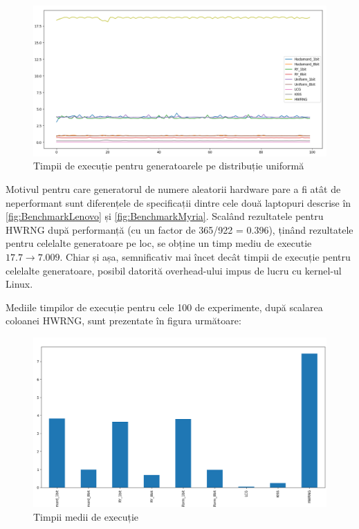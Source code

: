 \begin{figure}[H]
    \centering
    \includegraphics[width=1.0\textwidth]{continut/capitol4/figuri/PerformancesUniform.png}
    \caption{Timpii de execuție pentru generatoarele pe distribuție uniformă}
    \label{fig:UniformPerformances}
\end{figure}

Motivul pentru care generatorul de numere aleatorii hardware pare a fi atât de neperformant sunt diferențele de specificații dintre cele două laptopuri descrise în \ref{fig:BenchmarkLenovo} și \ref{fig:BenchmarkMyria}. Scalând rezultatele pentru HWRNG după performanță (cu un factor de 365/922 = 0.396), ținând rezultatele pentru celelalte generatoare pe loc, se obține un timp mediu de executie $17.7 \longrightarrow 7.009$. Chiar și așa, semnificativ mai încet decât timpii de execuție pentru celelalte generatoare, posibil datorită overhead-ului impus de lucru cu kernel-ul Linux.

Mediile timpilor de execuție pentru cele 100 de experimente, după scalarea coloanei HWRNG, sunt prezentate în figura următoare:

\begin{figure}[H]
    \centering
    \includegraphics[width=1.0\textwidth]{continut/capitol4/figuri/UniformMeanTimes.png}
    \caption{Timpii medii de execuție}
    \label{fig:UniformMeanTimes}
\end{figure}


